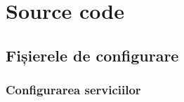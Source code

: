 \chapter{Source code}

\section{Fișierele de configurare
	\label{anx.cfg}}
\subsection{Configurarea serviciilor}
